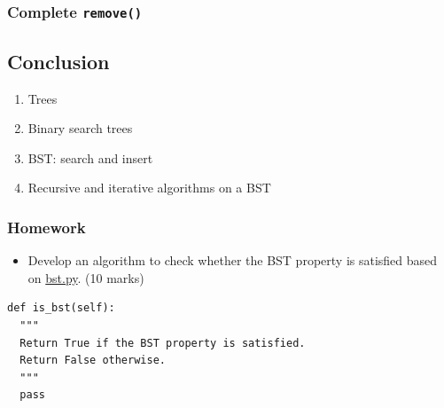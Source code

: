 \documentclass[aspectratio=169, 14pt]{beamer}
\begin{document}
\begin{frame}
  \frametitle{Complete \texttt{remove()}}

\end{frame}

\begin{frame}
  
  \section{\textcolor{darkmidnightblue}{Conclusion}} 

  \begin{enumerate}
    \item Trees
    \item Binary search trees
    \item BST: search and insert
    \item Recursive and iterative algorithms on a BST
  \end{enumerate}
\end{frame}

\begin{frame}[fragile]
  \frametitle{Homework}
\begin{itemize}
  \item Develop an algorithm to check whether the \alert{BST property} is satisfied based on \href{https://github.com/ChenZhongPu/data-structure-swufe/blob/master/code/python/tree/bst.py}{bst.py}. (10 marks)
\end{itemize}

\begin{verbatim}
def is_bst(self):
  """
  Return True if the BST property is satisfied.
  Return False otherwise.
  """
  pass
\end{verbatim}

\end{frame}
\end{document}
